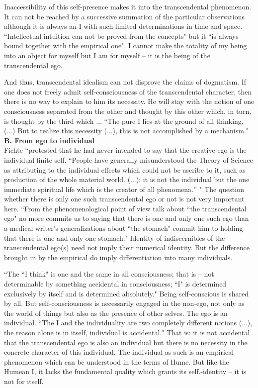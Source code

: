 Inaccessibility of this self-presence makes it into the transcendental phenomenon. It can not be reached by a 
successive summation of the particular observations although it is always an I with such limited determinations in 
time and space. ``Intellectual intuition can not be proved from the concepts" but it ``is always bound together with 
the empirical one". \cite{ITS} I cannot make the totality of my being into an object for myself but I am for myself -- it is 
the being of the transcendental ego.

And thus, transcendental idealism can not disprove the claims of dogmatism. If one does not freely admit self-consciousness of the transcendental character, then there is no way to explain to him its necessity. He will stay 
with the notion of one consciousness separated from  the other and thought by this other which, in turn, is 
thought by the third which ... ``The pure I lies at the ground of all thinking. (...) But to realize this necessity (...), 
this is not accomplished by a mechanism." \cite{ITS} \\[1ex]
{\bf B. From ego to individual} \\
Fichte ``protested that he had never intended to say that the creative ego is the individual finite self. ``People 
have generally misunderstood the Theory of Science as attributing to the individual effects which could not be 
ascribe to it, such as production of the whole material world. (...): it is not the individual but the one immediate 
spiritual life which is the creator of all phenomena."\ " \cite{HoP} The question whether there is only one such transcendental 
ego or not is not very important here. ``From the phenomenological point of view talk about ``the transcendental 
ego" no more commits us to saying that there is one and only one such ego than a medical writer's generalizations 
about ``the stomach" commit him to holding that there is one and only one stomach." \cite{HoP} Identity of indiscernibles of 
the transcendental ego(s) need not imply their numerical identity. But the difference brought in by the 
empirical do imply differentiation into many individuals. 

``The ``I think"  is one and the same in all consciousness; that is -- not determinable by something 
accidental in consciousness; ``I" is determined exclusively by itself and is determined absolutely." \cite{ITS} Being self-conscious is shared by all. But self-consciousness is necessarily engaged in the non-ego, not only as the world of 
things but also as the presence of other selves. The ego is an individual. ``The I and the individuality are two 
completely different notions (...), the reason alone is in itself, individual is accidental." \cite{ITS} That is: it is not 
accidental that the transcendental ego is also an individual but there is no necessity in the concrete character of this 
individual. The individual as such is an empirical phenomenon which can be understood in the terms of Hume. But 
like the Humean I, it lacks the fundamental quality which grants its self.-identity -- it is not for itself.

